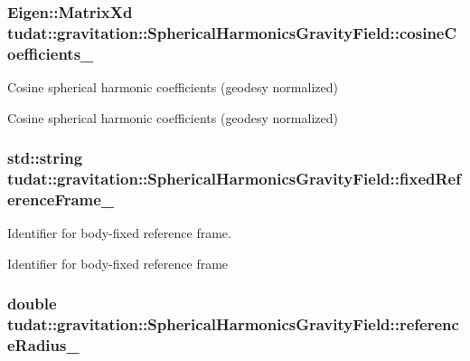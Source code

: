 \subsubsection[{\texorpdfstring{cosine\+Coefficients\+\_\+}{cosineCoefficients_}}]{\setlength{\rightskip}{0pt plus 5cm}Eigen\+::\+Matrix\+Xd tudat\+::gravitation\+::\+Spherical\+Harmonics\+Gravity\+Field\+::cosine\+Coefficients\+\_\+\hspace{0.3cm}{\ttfamily [protected]}}\hypertarget{classtudat_1_1gravitation_1_1SphericalHarmonicsGravityField_a976097b5feae44132eb1867c0b538869}{}\label{classtudat_1_1gravitation_1_1SphericalHarmonicsGravityField_a976097b5feae44132eb1867c0b538869}


Cosine spherical harmonic coefficients (geodesy normalized) 

Cosine spherical harmonic coefficients (geodesy normalized) 
\subsubsection[{\texorpdfstring{fixed\+Reference\+Frame\+\_\+}{fixedReferenceFrame_}}]{\setlength{\rightskip}{0pt plus 5cm}std\+::string tudat\+::gravitation\+::\+Spherical\+Harmonics\+Gravity\+Field\+::fixed\+Reference\+Frame\+\_\+\hspace{0.3cm}{\ttfamily [protected]}}\hypertarget{classtudat_1_1gravitation_1_1SphericalHarmonicsGravityField_a5524e491cd850068d2ea055635a5d301}{}\label{classtudat_1_1gravitation_1_1SphericalHarmonicsGravityField_a5524e491cd850068d2ea055635a5d301}


Identifier for body-\/fixed reference frame. 

Identifier for body-\/fixed reference frame 
\subsubsection[{\texorpdfstring{reference\+Radius\+\_\+}{referenceRadius_}}]{\setlength{\rightskip}{0pt plus 5cm}double tudat\+::gravitation\+::\+Spherical\+Harmonics\+Gravity\+Field\+::reference\+Radius\+\_\+\hspace{0.3cm}{\ttfamily [protected]}}\hypertarget{classtudat_1_1gravitation_1_1SphericalHarmonicsGravityField_a30a2d290373ba058f6b908e0c006997e}{}\label{classtudat_1_1gravitation_1_1SphericalHarmonicsGravityField_a30a2d290373ba058f6b908e0c006997e}


